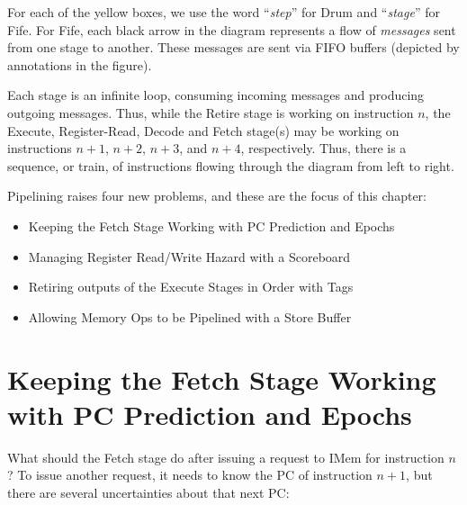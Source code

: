 For each of the yellow boxes, we use the word ``\emph{step}'' for Drum
and ``\emph{stage}'' for Fife.  For Fife, each black arrow in the
diagram represents a flow of \emph{messages} sent from one stage to
another.  These messages are sent via FIFO buffers (depicted by
annotations in the figure).

Each stage is an infinite loop, consuming incoming messages and
producing outgoing messages.  Thus, while the Retire stage is working
on instruction $n$, the Execute, Register-Read, Decode and Fetch
stage(s) may be working on instructions $n+1$, $n+2$, $n+3$, and
$n+4$, respectively.  Thus, there is a sequence, or train, of
instructions flowing through the diagram from left to right.

Pipelining raises four new problems, and these are the focus of this
chapter:

\begin{itemize}

  \item Keeping the Fetch Stage Working with PC Prediction and Epochs

  \item Managing Register Read/Write Hazard with a Scoreboard

  \item Retiring outputs of the Execute Stages in Order with Tags

  \item Allowing Memory Ops to be Pipelined with a Store Buffer

\end{itemize}


\section{Keeping the Fetch Stage Working with PC Prediction and Epochs}

\label{Sec_Epochs}

What should the Fetch stage do after issuing a request to IMem for
instruction $n$?  To issue another request, it needs to know the PC of
instruction $n+1$, but there are several uncertainties about that next
PC:

